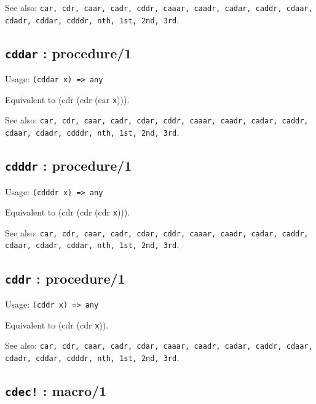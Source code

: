 \documentclass[
]{article}
\newcommand{\passthrough}[1]{#1}
\begin{document}
See also:
\passthrough{\lstinline!car, cdr, caar, cadr, cddr, caaar, caadr, cadar, caddr, cdaar, cdadr, cddar, cdddr, nth, 1st, 2nd, 3rd!}.

\hypertarget{cddar-procedure1-1}{%
\subsection{\texorpdfstring{\texttt{cddar} :
procedure/1}{cddar : procedure/1}}\label{cddar-procedure1-1}}

Usage: \passthrough{\lstinline!(cddar x) => any!}

Equivalent to (cdr (cdr (car \passthrough{\lstinline!x!}))).

See also:
\passthrough{\lstinline!car, cdr, caar, cadr, cdar, cddr, caaar, caadr, cadar, caddr, cdaar, cdadr, cdddr, nth, 1st, 2nd, 3rd!}.

\hypertarget{cdddr-procedure1-1}{%
\subsection{\texorpdfstring{\texttt{cdddr} :
procedure/1}{cdddr : procedure/1}}\label{cdddr-procedure1-1}}

Usage: \passthrough{\lstinline!(cdddr x) => any!}

Equivalent to (cdr (cdr (cdr \passthrough{\lstinline!x!}))).

See also:
\passthrough{\lstinline!car, cdr, caar, cadr, cdar, cddr, caaar, caadr, cadar, caddr, cdaar, cdadr, cddar, nth, 1st, 2nd, 3rd!}.

\hypertarget{cddr-procedure1-1}{%
\subsection{\texorpdfstring{\texttt{cddr} :
procedure/1}{cddr : procedure/1}}\label{cddr-procedure1-1}}

Usage: \passthrough{\lstinline!(cddr x) => any!}

Equivalent to (cdr (cdr \passthrough{\lstinline!x!})).

See also:
\passthrough{\lstinline!car, cdr, caar, cadr, cdar, caaar, caadr, cadar, caddr, cdaar, cdadr, cddar, cdddr, nth, 1st, 2nd, 3rd!}.

\hypertarget{cdec-macro1-1}{%
\subsection{\texorpdfstring{\texttt{cdec!} :
macro/1}{cdec! : macro/1}}\label{cdec-macro1-1}}
\end{document}
